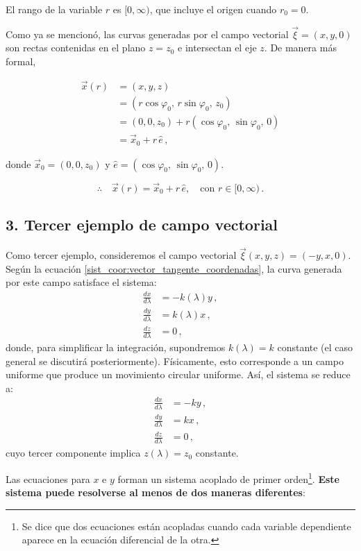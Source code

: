 \documentclass[../apunte_mecanica_clasica.tex]{subfiles}%
\begin{document}
El rango de la variable $r$ es $[0, \infty)$, que incluye el origen cuando $r_0 = 0$.

Como ya se mencionó, las curvas generadas por el campo vectorial $\vec{\xi} = (x, y, 0)$ son rectas contenidas en el plano $z = z_0$ e intersectan el eje $z$. De manera más formal,

\begin{align*}
\vec{x}(r) &= (x, y, z) \\
           &= (r \cos \varphi_0,\, r \sin \varphi_0,\, z_0) \\
           &= (0, 0, z_0) + r (\cos \varphi_0,\, \sin \varphi_0,\, 0) \\
           &= \vec{x}_0 + r\, \hat{e}\,,
\end{align*}

donde $\vec{x}_0 = (0, 0, z_0)$ y $\hat{e} = (\cos \varphi_0,\, \sin \varphi_0,\, 0)$.

\begin{equation*}
\therefore \quad \vec{x}(r) = \vec{x}_0 + r\, \hat{e}, \quad \text{con } r \in [0, \infty)\,.
\end{equation*}

\subsection*{3. Tercer ejemplo de campo vectorial }
Como tercer ejemplo, consideremos el campo vectorial $\vec{\xi}(x, y, z) = (-y, x, 0)$. Según la ecuación \eqref{sist_coor:vector_tangente_coordenadas}, la curva generada por este campo satisface el sistema:
\begin{align*}
\frac{dx}{d\lambda} & = -k(\lambda) y\,, \\
\frac{dy}{d\lambda} & = k(\lambda) x\,, \\
\frac{dz}{d\lambda} & = 0\,,
\end{align*}
donde, para simplificar la integración, supondremos $k(\lambda) = k$ constante (el caso general se discutirá posteriormente). Físicamente, esto corresponde a un campo uniforme que produce un movimiento circular uniforme.
Así, el sistema se reduce a:
\begin{align*}
\frac{dx}{d\lambda} & = -k y\,, \\
  \frac{dy}{d\lambda} & = k x\,, \\
\frac{dz}{d\lambda} & = 0\,,
\end{align*}
cuyo tercer componente implica $z(\lambda) = z_0$ constante.

Las ecuaciones para $x$ e $y$ forman un sistema acoplado de primer orden\footnote{Se dice que dos ecuaciones están acopladas cuando cada variable dependiente aparece en la ecuación diferencial de la otra.}. \textbf{Este sistema puede resolverse al menos de dos maneras diferentes}:
\end{document}
